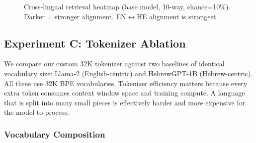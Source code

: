 \documentclass[10pt,twocolumn]{article}
\begin{document}
\begin{figure}[H]
\centering
{}
\caption{Cross-lingual retrieval heatmap (base model, 10-way, chance=10\%). Darker = stronger alignment. EN$\leftrightarrow$HE alignment is strongest.}
\label{fig:heatmap}
\end{figure}

\subsection{Experiment C: Tokenizer Ablation}
\label{sec:exp_c}

We compare our custom 32K tokenizer against two baselines of identical vocabulary size: Llama-2 (English-centric) and HebrewGPT-1B (Hebrew-centric). All three use 32K BPE vocabularies. Tokenizer efficiency matters because every extra token consumes context window space and training compute. A language that is split into many small pieces is effectively harder and more expensive for the model to process.

\subsubsection{Vocabulary Composition}
\end{document}
